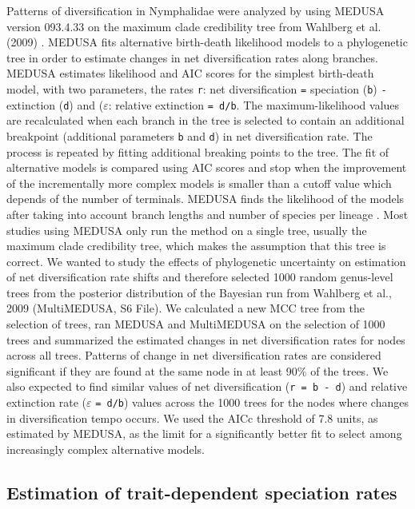 \documentclass[10pt,letterpaper]{article}
\begin{document}
Patterns of diversification in Nymphalidae were analyzed by using MEDUSA
version 093.4.33 \cite{alfaro2009} on the maximum clade credibility tree from
Wahlberg et al. (2009) \cite{wahlberg2009}. MEDUSA fits alternative birth-death
likelihood models to a phylogenetic tree in order to estimate changes in
net diversification rates along branches. MEDUSA estimates likelihood
and AIC scores for the simplest birth-death model, with two parameters,
the rates \texttt{r}: net diversification \texttt{=} speciation
(\texttt{b}) \texttt{-} extinction (\texttt{d}) and (\(\varepsilon\):
relative extinction \texttt{= d/b}.
The maximum-likelihood values are recalculated when each branch in the tree
is selected to contain an additional breakpoint (additional parameters
\texttt{b} and \texttt{d}) in net diversification rate. 
The process is repeated by fitting additional breaking points to the tree.
The fit of  alternative models is compared using AIC
scores and stop when the improvement of the incrementally more complex models 
is smaller than a cutoff value which
depends of the number of terminals.
MEDUSA finds the likelihood of the models after taking into
account branch lengths and number of species per lineage \cite{alfaro2009}. Most
studies using MEDUSA only run the method on a single tree, usually the
maximum clade credibility tree, which makes the assumption that this
tree is correct. We wanted to study the effects of phylogenetic
uncertainty on estimation of net diversification rate shifts and
therefore selected 1000 random genus-level trees from the posterior
distribution of the Bayesian run from Wahlberg et al., 2009 \cite{wahlberg2009}
(MultiMEDUSA, S6 File). We calculated a new MCC tree from the
selection of trees, ran MEDUSA and MultiMEDUSA on the selection of 1000
trees and summarized the estimated changes in net diversification rates
for nodes across all trees. Patterns of change in net diversification
rates are considered significant if they are found at the same node in
at least 90\% of the trees. We also expected to find similar values of
net diversification (\texttt{r = b - d}) and relative extinction rate
(\(\varepsilon\) \texttt{= d/b}) values across the 1000 trees for the
nodes where changes in diversification tempo occurs. We used the AICc
threshold of 7.8 units, as estimated by MEDUSA, as the limit for a
significantly better fit to select among increasingly complex
alternative models.

\subsection*{Estimation of trait-dependent speciation rates}
\end{document}
